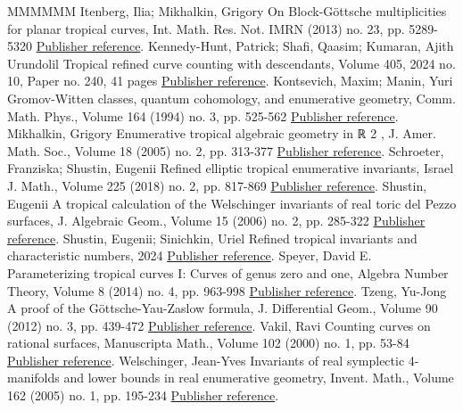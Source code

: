 \begin{thebibliography}{MMMMMM}
 Itenberg, Ilia; Mikhalkin, Grigory On Block-Göttsche multiplicities for planar tropical curves, Int. Math. Res. Not. IMRN (2013) no. 23, pp. 5289-5320 \href{https://alco.centre-mersenne.org/articles/10.5802/alco.444/#itenberg_block-gottsche_2013}{Publisher reference}.
 Kennedy-Hunt, Patrick; Shafi, Qaasim; Kumaran, Ajith Urundolil Tropical refined curve counting with descendants, Volume 405, 2024 no. 10, Paper no. 240, 41 pages \href{https://alco.centre-mersenne.org/articles/10.5802/alco.444/#kennedyhunt-2024-tropical}{Publisher reference}.
 Kontsevich, Maxim; Manin, Yuri Gromov-Witten classes, quantum cohomology, and enumerative geometry, Comm. Math. Phys., Volume 164 (1994) no. 3, pp. 525-562 \href{https://alco.centre-mersenne.org/articles/10.5802/alco.444/#kontsevich_gromov-witten_1994}{Publisher reference}.
 Mikhalkin, Grigory Enumerative tropical algebraic geometry in ℝ 2 , J. Amer. Math. Soc., Volume 18 (2005) no. 2, pp. 313-377 \href{https://alco.centre-mersenne.org/articles/10.5802/alco.444/#mikhalkin_enumerative_2005}{Publisher reference}.
 Schroeter, Franziska; Shustin, Eugenii Refined elliptic tropical enumerative invariants, Israel J. Math., Volume 225 (2018) no. 2, pp. 817-869 \href{https://alco.centre-mersenne.org/articles/10.5802/alco.444/#schroeter-2018-refined}{Publisher reference}.
 Shustin, Eugenii A tropical calculation of the Welschinger invariants of real toric del Pezzo surfaces, J. Algebraic Geom., Volume 15 (2006) no. 2, pp. 285-322 \href{https://alco.centre-mersenne.org/articles/10.5802/alco.444/#shustin-2006-tropical}{Publisher reference}.
 Shustin, Eugenii; Sinichkin, Uriel Refined tropical invariants and characteristic numbers, 2024 \href{https://alco.centre-mersenne.org/articles/10.5802/alco.444/#shustin-2024-refined}{Publisher reference}.
 Speyer, David E. Parameterizing tropical curves I: Curves of genus zero and one, Algebra Number Theory, Volume 8 (2014) no. 4, pp. 963-998 \href{https://alco.centre-mersenne.org/articles/10.5802/alco.444/#speyer-2014-parametrizing}{Publisher reference}.
 Tzeng, Yu-Jong A proof of the Göttsche-Yau-Zaslow formula, J. Differential Geom., Volume 90 (2012) no. 3, pp. 439-472 \href{https://alco.centre-mersenne.org/articles/10.5802/alco.444/#tzeng_proof_2012}{Publisher reference}.
 Vakil, Ravi Counting curves on rational surfaces, Manuscripta Math., Volume 102 (2000) no. 1, pp. 53-84 \href{https://alco.centre-mersenne.org/articles/10.5802/alco.444/#vakil-2000-counting}{Publisher reference}.
 Welschinger, Jean-Yves Invariants of real symplectic 4-manifolds and lower bounds in real enumerative geometry, Invent. Math., Volume 162 (2005) no. 1, pp. 195-234 \href{https://alco.centre-mersenne.org/articles/10.5802/alco.444/#welschinger_invariants_2005}{Publisher reference}.
\end{thebibliography}
